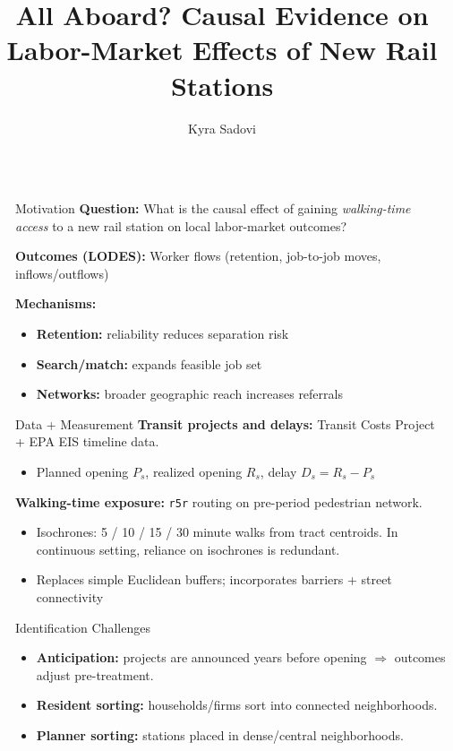 \documentclass[final]{beamer}
\title{All Aboard? Causal Evidence on Labor-Market Effects of New Rail Stations}
\author{Kyra Sadovi}
\institute[shortinst]{Harris School of Public Policy, University of Chicago}
\newlength{\sepwidth}
\newlength{\colwidth}
\newcommand{\separatorcolumn}{\begin{column}{\sepwidth}\end{column}}
\begin{document}
\begin{frame}[t]
\begin{columns}[t]
\separatorcolumn

\begin{column}{\colwidth}

  \begin{block}{Motivation}
  \textbf{Question:} What is the causal effect of gaining \emph{walking-time access} to a new rail station on local labor-market outcomes?

  \vspace{0.5em}
  \textbf{Outcomes (LODES):} Worker flows (retention, job-to-job moves, inflows/outflows)

  \vspace{0.4em}
  \textbf{Mechanisms:}
  \begin{itemize}
    \item \textbf{Retention:} reliability reduces separation risk
    \item \textbf{Search/match:} expands feasible job set
    \item \textbf{Networks:} broader geographic reach increases referrals
  \end{itemize}
  \end{block}

  \begin{block}{Data + Measurement}
  \textbf{Transit projects and delays:} Transit Costs Project + EPA EIS timeline data.
  \begin{itemize}
    \item Planned opening $P_s$, realized opening $R_s$, delay $D_s = R_s - P_s$
  \end{itemize}
  \textbf{Walking-time exposure:} \texttt{r5r} routing on pre-period pedestrian network.
  \begin{itemize}
    \item Isochrones: 5 / 10 / 15 / 30 minute walks from tract centroids. In continuous setting, reliance on isochrones is redundant.
    \item Replaces simple Euclidean buffers; incorporates barriers + street connectivity
  \end{itemize}
  \end{block}

  \begin{block}{Identification Challenges}
  \begin{itemize}
    \item \textbf{Anticipation:} projects are announced years before opening $\Rightarrow$ outcomes adjust pre-treatment.
    \item \textbf{Resident sorting:} households/firms sort into connected neighborhoods.
    \item \textbf{Planner sorting:} stations placed in dense/central neighborhoods.
  \end{itemize}
  \end{block}


\end{column}
\end{columns}
\end{frame}
\end{document}
